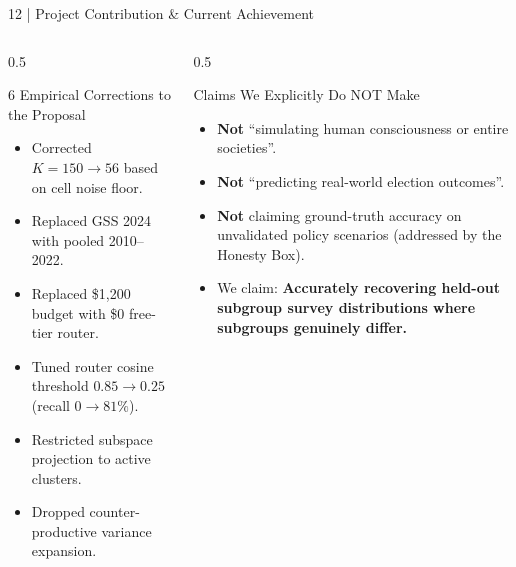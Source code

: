 \documentclass[10pt,aspectratio=169]{beamer}
\begin{document}
\begin{frame}{12 | Project Contribution \& Current Achievement}
    \vspace{0.1cm}
    \begin{columns}[T]
        \begin{column}{0.5\textwidth}
            \begin{block}{6 Empirical Corrections to the Proposal}
                \tiny
                \begin{itemize}\itemsep2pt
                    \item Corrected $K=150 \to 56$ based on cell noise floor.
                    \item Replaced GSS 2024 with pooled 2010--2022.
                    \item Replaced \$1,200 budget with \$0 free-tier router.
                    \item Tuned router cosine threshold $0.85 \to 0.25$ (recall $0 \to 81\%$).
                    \item Restricted subspace projection to active clusters.
                    \item Dropped counter-productive variance expansion.
                \end{itemize}
            \end{block}
        \end{column}
        \begin{column}{0.5\textwidth}
            \begin{block}{Claims We Explicitly Do NOT Make}
                \tiny
                \begin{itemize}\itemsep2pt
                    \item \textbf{Not} ``simulating human consciousness or entire societies''.
                    \item \textbf{Not} ``predicting real-world election outcomes''.
                    \item \textbf{Not} claiming ground-truth accuracy on unvalidated policy scenarios (addressed by the Honesty Box).
                    \item We claim: \textbf{Accurately recovering held-out subgroup survey distributions where subgroups genuinely differ.}
                \end{itemize}
            \end{block}
        \end{column}
    \end{columns}
\end{frame}
\end{document}
